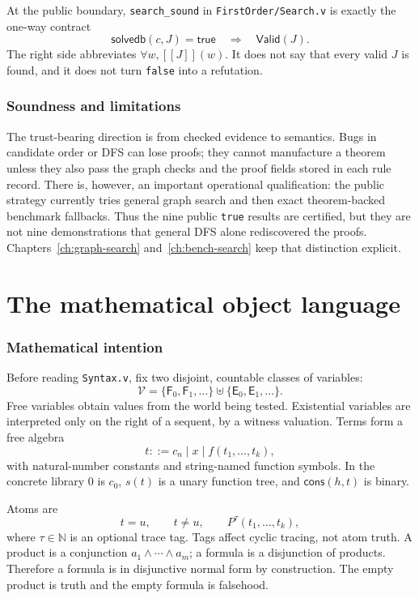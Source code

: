 \documentclass[11pt,oneside]{book}
\DeclareRobustCommand{\code}[1]{\nolinkurl{#1}}
\DeclareRobustCommand{\file}[1]{\nolinkurl{#1}}
\newcommand{\src}[2]{\code{#2} in \file{#1}}
\newcommand{\Nat}{\mathbb{N}}
\newcommand{\sem}[1]{[\![#1]\!]}
\newcommand{\Valid}{\mathsf{Valid}}
\newcommand{\FV}{\mathsf{F}}
\newcommand{\EV}{\mathsf{E}}
\newcommand{\mathintent}{\subsection*{Mathematical intention}}
\newcommand{\soundlim}{\subsection*{Soundness and limitations}}
\begin{document}
At the public boundary, \src{FirstOrder/Search.v}{search_sound} is exactly the
one-way contract
\begin{equation}
  \mathsf{solvedb}(c,J)=\mathsf{true}
  \quad\Longrightarrow\quad
  \Valid(J).
  \label{eq:public-contract}
\end{equation}
The right side abbreviates \(\forall w,\sem{J}(w)\).  It does not say that
every valid \(J\) is found, and it does not turn \code{false} into a refutation.

\soundlim

The trust-bearing direction is from checked evidence to semantics.  Bugs in
candidate order or DFS can lose proofs; they cannot manufacture a theorem
unless they also pass the graph checks and the proof fields stored in each rule
record.  There is, however, an important operational qualification: the public
strategy currently tries general graph search and then exact theorem-backed
benchmark fallbacks.  Thus the nine public \code{true} results are certified,
but they are not nine demonstrations that general DFS alone rediscovered the
proofs.  Chapters~\ref{ch:graph-search} and~\ref{ch:bench-search} keep that
distinction explicit.

\chapter{The mathematical object language}
\label{ch:object-language}

\mathintent

Before reading \file{Syntax.v}, fix two disjoint, countable classes of
variables:
\[
  \mathcal V = \{\FV_0,\FV_1,\ldots\}
       \uplus \{\EV_0,\EV_1,\ldots\}.
\]
Free variables obtain values from the world being tested.  Existential
variables are interpreted only on the right of a sequent, by a witness
valuation.  Terms form a free algebra
\[
 t ::= c_n \mid x \mid f(t_1,\ldots,t_k),
\]
with natural-number constants and string-named function symbols.  In the
concrete library \(0\) is \(c_0\), \(s(t)\) is a unary function tree, and
\(\mathsf{cons}(h,t)\) is binary.

Atoms are
\[
 t=u,\qquad t\ne u,\qquad P^{\tau}(t_1,\ldots,t_k),
\]
where \(\tau\in\Nat\) is an optional trace tag.  Tags affect cyclic tracing,
not atom truth.  A product is a conjunction \(a_1\land\cdots\land a_m\); a
formula is a disjunction of products.  Therefore a formula is in disjunctive
normal form by construction.  The empty product is truth and the empty formula
is falsehood.
\end{document}
